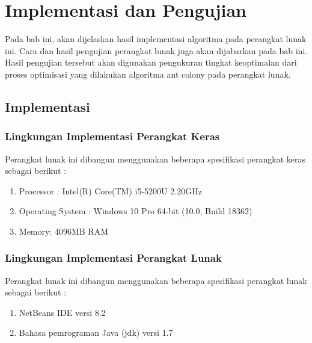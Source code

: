 \chapter{Implementasi dan Pengujian}
\label{chap:implementasi}

Pada bab ini, akan dijelaskan hasil implementasi algoritma pada perangkat lunak ini. Cara dan
hasil pengujian perangkat lunak juga akan dijabarkan pada bab ini. Hasil pengujian tersebut akan
digunakan pengukuran tingkat keoptimalan dari proses optimisasi yang dilakukan algoritma ant
colony pada perangkat lunak.

\section{Implementasi}

\subsection{Lingkungan Implementasi Perangkat Keras}

Perangkat lunak ini dibangun menggunakan beberapa spesifikasi perangkat keras sebagai berikut :
\begin{enumerate}
	\item  Processor : Intel(R) Core(TM) i5-5200U 2.20GHz 
	\item  Operating System : Windows 10 Pro 64-bit (10.0, Build 18362) 
	\item  Memory: 4096MB RAM
\end{enumerate}

\subsection{Lingkungan Implementasi Perangkat Lunak}

Perangkat lunak ini dibangun menggunakan beberapa spesifikasi perangkat lunak sebagai berikut :
\begin{enumerate}
	\item NetBeans IDE versi 8.2
	\item Bahasa pemrograman Java (jdk) versi 1.7

	
\end{enumerate}